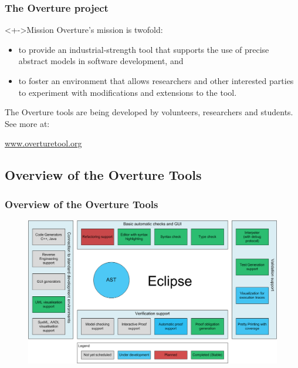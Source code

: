 \frame
{
  \frametitle{The Overture project}

\begin{block}<+->{Mission}
	Overture's mission is twofold: 
  \begin{itemize}
  		\item to provide an industrial-strength tool that supports the use of precise abstract models in software development, and 
  		\item to foster an environment that allows researchers and other interested parties to experiment with modifications and extensions to the tool.      

  \end{itemize}
\end{block}

The Overture tools are being developed by volunteers, researchers and students. See more at:
\begin{center}
\href{www.overturetool.org}{www.overturetool.org}
\end{center}

}


\subsection{Overview of the Overture Tools}
\frame
{
  \frametitle{Overview of the Overture Tools}

\begin{figure}[t]
\centering
\includegraphics[width=\textwidth]{images/OvertureOverview}
\label{fig:}
\end{figure}

}

